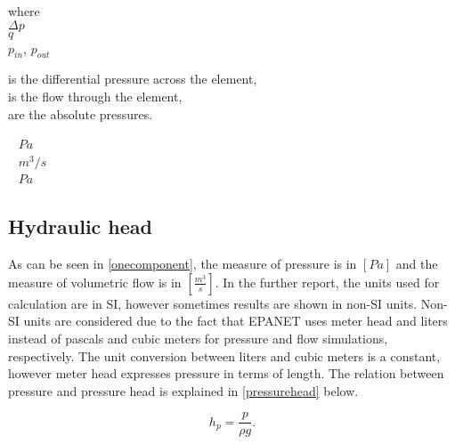 \begin{minipage}[t]{0.20\textwidth}
where\\
\hspace*{8mm} $\Delta p$ \\
\hspace*{8mm} $q$ \\
\hspace*{8mm} $p_{in}$, $p_{out}$ 
\end{minipage}
\begin{minipage}[t]{0.68\textwidth}
\vspace*{2mm}
is the differential pressure across the element,\\
is the flow through the element,\\
are the absolute pressures.
\end{minipage}
\begin{minipage}[t]{0.10\textwidth}
\vspace*{2mm}
\textcolor{White}{te}$\unit{Pa}$\\
\textcolor{White}{te}$\unit{m^3/s}$\\
\textcolor{White}{te}$\unit{Pa}$
\end{minipage}

\subsection{Hydraulic head}
\label{hydraulic_head}

As can be seen in \eqref{onecomponent}, the measure of pressure is in $[Pa]$ and the measure of volumetric flow is in $[\frac{m^3}{s}]$. In the further report, the units used for calculation are in SI, however sometimes results are shown in non-SI units. Non-SI units are considered due to the fact that EPANET uses meter head and liters instead of pascals and cubic meters for pressure and flow simulations, respectively. The unit conversion between liters and cubic meters is a constant, however meter head expresses pressure in terms of length. The relation between pressure and pressure head is explained in \eqref{pressurehead} below. 

\begin{equation}
\label{pressurehead}
  h_p = \frac{p}{\rho g}.
\end{equation} 

